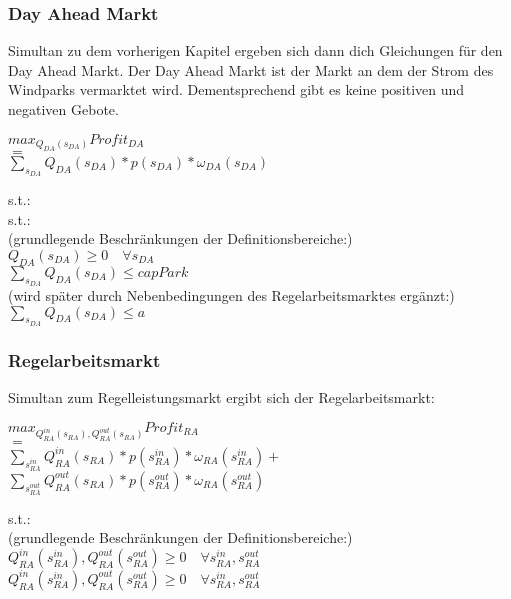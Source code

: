 \subsubsection{Day Ahead Markt}
Simultan zu dem vorherigen Kapitel ergeben sich dann dich Gleichungen für den Day Ahead Markt.
Der Day Ahead Markt ist der Markt an dem der Strom des Windparks vermarktet wird. Dementsprechend gibt es keine positiven und negativen Gebote.

\begin{center}
	$max_{Q_{DA}(s_{DA})} Profit_{DA}$\\
	$=$\\
	$\sum_{s_{DA}} Q_{DA}(s_{DA}) * p(s_{DA}) * \omega_{DA}(s_{DA})$\\

\end{center}
s.t.:\\

s.t.:\\
(grundlegende Beschränkungen der Definitionsbereiche:)\\
$Q_{DA}(s_{DA}) \geq 0\quad\forall  s_{DA} $\\
$ \sum_{s_{DA}}Q_{DA}(s_{DA}) \leq capPark $\\
(wird später durch Nebenbedingungen des Regelarbeitsmarktes ergänzt:)\\
$ \sum_{s_{DA}}Q_{DA}(s_{DA})\leq a  $\\


\subsubsection{Regelarbeitsmarkt}
Simultan zum Regelleistungsmarkt ergibt sich der Regelarbeitsmarkt:
\begin{center}
	$max_{Q^{in}_{RA}(s_{RA}), Q^{out}_{RA}(s_{RA})} Profit_{RA}$\\
	$=$\\
	$\sum_{s^{in}_{RA}} Q^{in}_{RA}(s_{RA}) * p(s^{in}_{RA}) * \omega_{RA}(s^{in}_{RA}) +$\\
	$\sum_{s^{out}_{RA}} Q^{out}_{RA}(s_{RA}) * p(s^{out}_{RA}) * \omega_{RA}(s^{out}_{RA})$\\
\end{center}
s.t.:\\
(grundlegende Beschränkungen der Definitionsbereiche:)\\
$Q^{in}_{RA}(s^{in}_{RA}),Q^{out}_{RA}(s^{out}_{RA}) \geq 0 \quad\forall s^{in}_{RA},s^{out}_{RA} $\\
$Q^{in}_{RA}(s^{in}_{RA}),Q^{out}_{RA}(s^{out}_{RA}) \geq 0\quad\forall  s^{in}_{RA},s^{out}_{RA} $\\


